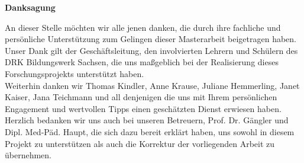 \vspace*{\fill}
\begin{center}
\textbf{Danksagung}
\end{center}

\noindent 
An dieser Stelle möchten wir alle jenen danken, die durch ihre fachliche und persönliche Unterstützung zum Gelingen dieser Masterarbeit beigetragen haben.\\[0,5cm]
Unser Dank gilt der Geschäftsleitung, den involvierten Lehrern und Schülern des DRK Bildungswerk Sachsen, die uns maßgeblich bei der Realisierung dieses Forschungsprojekts unterstützt haben.\\[0,5cm]
Weiterhin danken wir Thomas Kindler, Anne Krause, Juliane Hemmerling, Janet Kaiser, Jana Teichmann und all denjenigen die uns mit Ihrem persönlichen Engagement und wertvollen Tipps einen geschätzten Dienst erwiesen haben.\\[0,5cm]
Herzlich bedanken wir uns auch bei unseren Betreuern, Prof. Dr. Gängler und Dipl. Med-Päd. Haupt, die sich dazu bereit erklärt haben, uns sowohl in diesem Projekt zu unterstützen als auch die Korrektur der vorliegenden Arbeit zu übernehmen.
\vspace{\fill}